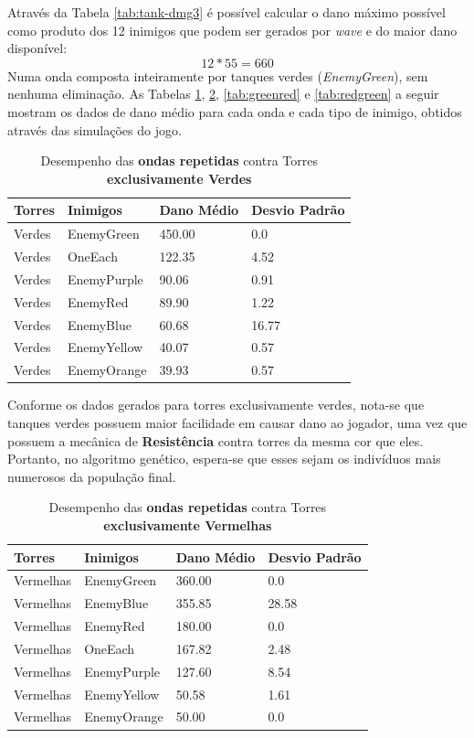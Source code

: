 Através da Tabela \ref{tab:tank-dmg3} é possível calcular o dano máximo possível como produto dos 12 inimigos que podem ser gerados por \textit{wave} e do maior dano disponível:
\[12 * 55 = 660\]
Numa onda composta inteiramente por tanques verdes (\textit{EnemyGreen}), sem nenhuma eliminação. As Tabelas \ref{tab:green}, \ref{tab:red}, \ref{tab:greenred} e \ref{tab:redgreen} a seguir mostram os dados de dano médio para cada onda e cada tipo de inimigo, obtidos através das simulações do jogo.

\begin{table}
\caption{Desempenho das \textbf{ondas repetidas} contra Torres \textbf{exclusivamente Verdes}}
\begin{tabular}{l|l|ll}
Torres & Inimigos & Dano Médio & Desvio Padrão \\ \hline
Verdes & EnemyGreen    & 450.00     & 0.0           \\
Verdes & OneEach       & 122.35     & 4.52          \\
Verdes & EnemyPurple   & 90.06      & 0.91          \\
Verdes & EnemyRed      & 89.90      & 1.22          \\
Verdes & EnemyBlue     & 60.68      & 16.77         \\
Verdes & EnemyYellow   & 40.07      & 0.57          \\
Verdes & EnemyOrange   & 39.93      & 0.57         
\end{tabular}
\label{tab:green}
\end{table}

Conforme os dados gerados para torres exclusivamente verdes, nota-se que tanques verdes possuem maior facilidade em causar dano ao jogador, uma vez que possuem a mecânica de \textbf{Resistência} contra torres da mesma cor que eles. Portanto, no algoritmo genético, espera-se que esses sejam os indivíduos mais numerosos da população final.

\begin{table}
\caption{Desempenho das \textbf{ondas repetidas} contra Torres \textbf{exclusivamente Vermelhas}}
\begin{tabular}{l|l|ll}
Torres    & Inimigos & Dano Médio & Desvio Padrão \\ \hline
Vermelhas & EnemyGreen    & 360.00     & 0.0           \\
Vermelhas & EnemyBlue     & 355.85     & 28.58         \\
Vermelhas & EnemyRed      & 180.00     & 0.0           \\
Vermelhas & OneEach       & 167.82     & 2.48          \\
Vermelhas & EnemyPurple   & 127.60     & 8.54          \\
Vermelhas & EnemyYellow   & 50.58      & 1.61          \\
Vermelhas & EnemyOrange   & 50.00      & 0.0          
\end{tabular}
\label{tab:red}
\end{table}


